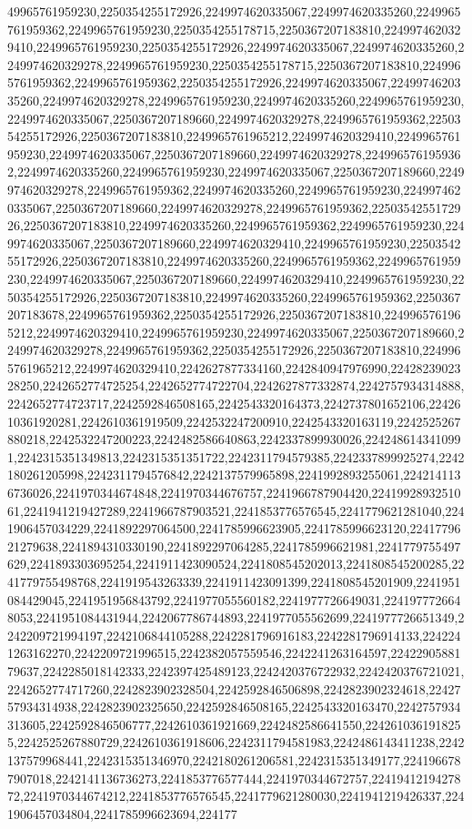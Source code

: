 49965761959230,2250354255172926,2249974620335067,2249974620335260,2249965761959362,2249965761959230,2250354255178715,2250367207183810,2249974620329410,2249965761959230,2250354255172926,2249974620335067,2249974620335260,2249974620329278,2249965761959230,2250354255178715,2250367207183810,2249965761959362,2249965761959362,2250354255172926,2249974620335067,2249974620335260,2249974620329278,2249965761959230,2249974620335260,2249965761959230,2249974620335067,2250367207189660,2249974620329278,2249965761959362,2250354255172926,2250367207183810,2249965761965212,2249974620329410,2249965761959230,2249974620335067,2250367207189660,2249974620329278,2249965761959362,2249974620335260,2249965761959230,2249974620335067,2250367207189660,2249974620329278,2249965761959362,2249974620335260,2249965761959230,2249974620335067,2250367207189660,2249974620329278,2249965761959362,2250354255172926,2250367207183810,2249974620335260,2249965761959362,2249965761959230,2249974620335067,2250367207189660,2249974620329410,2249965761959230,2250354255172926,2250367207183810,2249974620335260,2249965761959362,2249965761959230,2249974620335067,2250367207189660,2249974620329410,2249965761959230,2250354255172926,2250367207183810,2249974620335260,2249965761959362,2250367207183678,2249965761959362,2250354255172926,2250367207183810,2249965761965212,2249974620329410,2249965761959230,2249974620335067,2250367207189660,2249974620329278,2249965761959362,2250354255172926,2250367207183810,2249965761965212,2249974620329410,2242627877334160,2242840947976990,2242823902328250,2242652774725254,2242652774722704,2242627877332874,2242757934314888,2242652774723717,2242592846508165,2242543320164373,2242737801652106,2242610361920281,2242610361919509,2242532247200910,2242543320163119,2242525267880218,2242532247200223,2242482586640863,2242337899930026,2242486143410991,2242315351349813,2242315351351722,2242311794579385,2242337899925274,2242180261205998,2242311794576842,2242137579965898,2241992893255061,2242141136736026,2241970344674848,2241970344676757,2241966787904420,2241992893251061,2241941219427289,2241966787903521,2241853776576545,2241779621281040,2241906457034229,2241892297064500,2241785996623905,2241785996623120,2241779621279638,2241894310330190,2241892297064285,2241785996621981,2241779755497629,2241893303695254,2241911423090524,2241808545202013,2241808545200285,2241779755498768,2241919543263339,2241911423091399,2241808545201909,2241951084429045,2241951956843792,2241977055560182,2241977726649031,2241977726648053,2241951084431944,2242067786744893,2241977055562699,2241977726651349,2242209721994197,2242106844105288,2242281796916183,2242281796914133,2242241263162270,2242209721996515,2242382057559546,2242241263164597,2242290588179637,2242285018142333,2242397425489123,2242420376722932,2242420376721021,2242652774717260,2242823902328504,2242592846506898,2242823902324618,2242757934314938,2242823902325650,2242592846508165,2242543320163470,2242757934313605,2242592846506777,2242610361921669,2242482586641550,2242610361918255,2242525267880729,2242610361918606,2242311794581983,2242486143411238,2242137579968441,2242315351346970,2242180261206581,2242315351349177,2241966787907018,2242141136736273,2241853776577444,2241970344672757,2241941219427872,2241970344674212,2241853776576545,2241779621280030,2241941219426337,2241906457034804,2241785996623694,224177